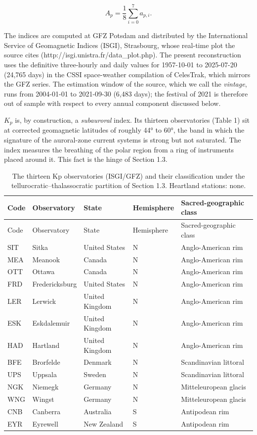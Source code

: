 \documentclass[
  10pt,
  a4paper,
]{article}
\begin{document}
\[A_p = \frac{1}{8}\sum_{i=0}^{7} a_{p,i}.\]

The indices are computed at GFZ Potsdam and distributed by the
International Service of Geomagnetic Indices (ISGI), Strasbourg, whose
real-time plot the source cites (http://isgi.unistra.fr/data\_plot.php).
The present reconstruction uses the definitive three-hourly and daily
values for 1957-10-01 to 2025-07-20 (24,765 days) in the CSSI
space-weather compilation of CelesTrak, which mirrors the GFZ series.
The estimation window of the source, which we call the \emph{vintage},
runs from 2004-01-01 to 2021-09-30 (6,483 days); the festival of 2021 is
therefore out of sample with respect to every annual component discussed
below.

\(K_p\) is, by construction, a \emph{subauroral} index. Its thirteen
observatories (Table 1) sit at corrected geomagnetic latitudes of
roughly 44° to 60°, the band in which the signature of the auroral-zone
current systems is strong but not saturated. The index measures the
breathing of the polar region from a ring of instruments placed around
it. This fact is the hinge of Section 1.3.

\begin{longtable}[]{@{}lllll@{}}
\caption{The thirteen Kp observatories (ISGI/GFZ) and their
classification under the tellurocratic--thalassocratic partition of
Section 1.3. Heartland stations: none.}\tabularnewline
\toprule\noalign{}
Code & Observatory & State & Hemisphere & Sacred-geographic class \\
\midrule\noalign{}
\endfirsthead
\toprule\noalign{}
Code & Observatory & State & Hemisphere & Sacred-geographic class \\
\midrule\noalign{}
\endhead
\bottomrule\noalign{}
\endlastfoot
SIT & Sitka & United States & N & Anglo-American rim \\
MEA & Meanook & Canada & N & Anglo-American rim \\
OTT & Ottawa & Canada & N & Anglo-American rim \\
FRD & Fredericksburg & United States & N & Anglo-American rim \\
LER & Lerwick & United Kingdom & N & Anglo-American rim \\
ESK & Eskdalemuir & United Kingdom & N & Anglo-American rim \\
HAD & Hartland & United Kingdom & N & Anglo-American rim \\
BFE & Brorfelde & Denmark & N & Scandinavian littoral \\
UPS & Uppsala & Sweden & N & Scandinavian littoral \\
NGK & Niemegk & Germany & N & Mitteleuropean glacis \\
WNG & Wingst & Germany & N & Mitteleuropean glacis \\
CNB & Canberra & Australia & S & Antipodean rim \\
EYR & Eyrewell & New Zealand & S & Antipodean rim \\
\end{longtable}
\end{document}
